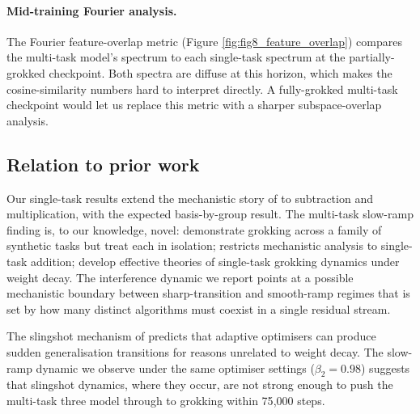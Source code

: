 \paragraph{Mid-training Fourier analysis.}
The Fourier feature-overlap metric (Figure
\ref{fig:fig8_feature_overlap}) compares the multi-task model's
spectrum to each single-task spectrum at the partially-grokked
checkpoint. Both spectra are diffuse at this horizon, which makes the
cosine-similarity numbers hard to interpret directly. A fully-grokked
multi-task checkpoint would let us replace this metric with a
sharper subspace-overlap analysis.

\subsection{Relation to prior work}

Our single-task results extend the mechanistic story of
\citet{nanda2023progress} to subtraction and multiplication, with the
expected basis-by-group result. The multi-task slow-ramp finding is,
to our knowledge, novel: \citet{power2022grokking} demonstrate
grokking across a family of synthetic tasks but treat each in
isolation; \citet{nanda2023progress} restricts mechanistic analysis to
single-task addition; \citet{liu2022omnigrok,liu2022understanding}
develop effective theories of single-task grokking dynamics under
weight decay. The interference dynamic we report points at a possible
mechanistic boundary between sharp-transition and smooth-ramp regimes
that is set by how many distinct algorithms must coexist in a single
residual stream.

The slingshot mechanism of \citet{thilak2022slingshot} predicts that
adaptive optimisers can produce sudden generalisation transitions for
reasons unrelated to weight decay. The slow-ramp dynamic we observe
under the same optimiser settings ($\beta_2 = 0.98$) suggests that
slingshot dynamics, where they occur, are not strong enough to push
the multi-task three model through to grokking within 75{,}000 steps.
